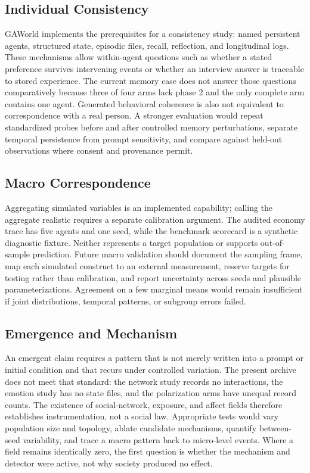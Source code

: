 \subsection{Individual Consistency}

GAWorld implements the prerequisites for a consistency study: named persistent
agents, structured state, episodic files, recall, reflection, and longitudinal
logs.  These mechanisms allow within-agent questions such as whether a stated
preference survives intervening events or whether an interview answer is
traceable to stored experience.  The current memory case does not answer those
questions comparatively because three of four arms lack phase 2 and the only
complete arm contains one agent.  Generated behavioral coherence is also not
equivalent to correspondence with a real person.  A stronger evaluation would
repeat standardized probes before and after controlled memory perturbations,
separate temporal persistence from prompt sensitivity, and compare against
held-out observations where consent and provenance permit.

\subsection{Macro Correspondence}

Aggregating simulated variables is an implemented capability; calling the
aggregate realistic requires a separate calibration argument.  The audited
economy trace has five agents and one seed, while the benchmark scorecard is a
synthetic diagnostic fixture.  Neither represents a target population or
supports out-of-sample prediction.  Future macro validation should document
the sampling frame, map each simulated construct to an external measurement,
reserve targets for testing rather than calibration, and report uncertainty
across seeds and plausible parameterizations.  Agreement on a few marginal
means would remain insufficient if joint distributions, temporal patterns, or
subgroup errors failed.

\subsection{Emergence and Mechanism}

An emergent claim requires a pattern that is not merely written into a prompt
or initial condition and that recurs under controlled variation.  The present
archive does not meet that standard: the network study records no interactions,
the emotion study has no state files, and the polarization arms have unequal
record counts.  The existence of social-network, exposure, and affect fields
therefore establishes instrumentation, not a social law.  Appropriate tests
would vary population size and topology, ablate candidate mechanisms, quantify
between-seed variability, and trace a macro pattern back to micro-level events.
Where a field remains identically zero, the first question is whether the
mechanism and detector were active, not why society produced no effect.

